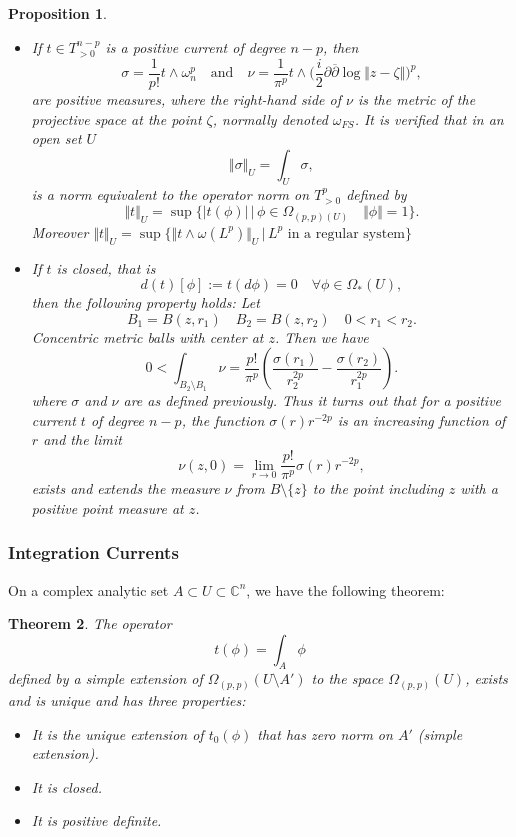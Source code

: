 \documentclass[12pt,twoside,a4paper]{report}
\newtheorem{theorem}{Theorem}[section]
\newtheorem{prop}[theorem]{Proposition}
\newcommand{\om}{\ensuremath{\Omega}}
\begin{document}
\begin{prop}
\begin{itemize}
        \item[4] If $t\in T^{n-p}_{>0}$ is a positive current of degree $n-p$, then
        \[
            \sigma=\frac{1}{p!}t\wedge\omega_n^{p}
            \quad\text{and}\quad
            \nu=\frac{1}{\pi^p}t\wedge\Big(\frac{i}{2}\partial\overline{\partial}\log\Vert z-\zeta\Vert\Big)^{p},
        \]
        are positive measures, where the right-hand side of $\nu$ is the metric of the projective space at the point $\zeta$, normally denoted $\omega_{FS}$. It is verified that in an open set $U$
        \[
            \Vert\sigma\Vert_{U}=\int_{U}\sigma,
        \]
        is a norm equivalent to the operator norm on $T^p_{>0}$ defined by
        \[
            \Vert t\Vert_U=\sup\{|t(\phi)|\,\vert\,\phi\in \om_{(p,p)(U)}\quad\Vert\phi\Vert=1\}.
        \]
        Moreover $\Vert t\Vert_U=\sup\{\Vert t\wedge\omega(L^{p})\Vert_U\,\vert\,L^{p}\text{ in a regular system}\}$
        \item[5] If $t$ is closed, that is
        \[
            d(t)[\phi]:=t(d\phi)=0\quad\forall\phi\in\om_{*}(U),
        \]
        then the following property holds: Let
        \[
            B_1=B(z,r_1)\quad B_2=B(z,r_2)\quad 0<r_1<r_2.
        \]
        Concentric metric balls with center at $z$. Then we have
        \[
            0<\int_{B_2\setminus B_1}\nu= \frac{p!}{\pi^{p}}(\frac{\sigma(r_1)}{r^{2p}_2}-\frac{\sigma(r_2)}{r^{2p}_1}).
        \]
        where $\sigma$ and $\nu$ are as defined previously. Thus it turns out that for a positive current $t$ of degree $n-p$, the function $\sigma(r)r^{-2p}$ is an increasing function of $r$ and the limit
        \[
            \nu(z,0)=\lim_{r\rightarrow 0}\frac{p!}{\pi^{p}}\sigma(r)r^{-2p},
        \]
        exists and extends the measure $\nu$ from $B\setminus\{z\}$ to the point including $z$ with a positive point measure at $z$.
    \end{itemize}
\end{prop}


\subsubsection{Integration Currents}
\label{sec:org9982aa5}
On a complex analytic set $A\subset U\subset\mathbb{C}^n$, we have the following theorem:

\begin{theorem}
The operator
\[
    t(\phi)=\int_A\phi
\]
defined by a simple extension of $\om_{(p,p)}(U\setminus A')$ to the space $\om_{(p,p)}(U)$, exists and is unique and has three properties:
\begin{itemize}
    \item[a] It is the unique extension of $t_0(\phi)$ that has zero norm on $A'$ (simple extension).
    \item[b] It is closed.
    \item[c] It is positive definite.
\end{itemize}
\end{theorem}
\end{document}
